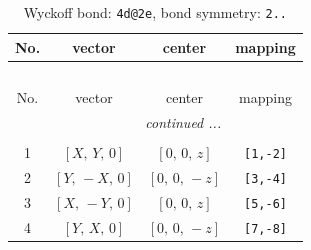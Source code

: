 \documentclass[fleqn,8pt]{jsarticle}
\begin{document}
\renewcommand{\arraystretch}{1.2}
\begin{longtable}{cccc}
\caption{Wyckoff bond: {\tt 4d@2e}, bond symmetry: {\tt 2..}}
 \\
 \hline \hline
No. & vector & center & mapping \\ \hline \endfirsthead

\multicolumn{3}{l}{\tablename\ \thetable{}} \\
 \hline \hline
No. & vector & center & mapping \\ \hline \endhead

 \hline \hline
\multicolumn{3}{r}{\footnotesize\it continued ...} \\ \endfoot

 \hline \hline
\multicolumn{3}{r}{} \\ \endlastfoot

1 & $\left[ X,\, Y,\, 0 \right]$ & $\left[ 0,\, 0,\, z \right]$ & {\tt [1,-2]} \\ \hline
2 & $\left[ Y,\, - X,\, 0 \right]$ & $\left[ 0,\, 0,\, - z \right]$ & {\tt [3,-4]} \\ \hline
3 & $\left[ X,\, - Y,\, 0 \right]$ & $\left[ 0,\, 0,\, z \right]$ & {\tt [5,-6]} \\ \hline
4 & $\left[ Y,\, X,\, 0 \right]$ & $\left[ 0,\, 0,\, - z \right]$ & {\tt [7,-8]} \\
\end{longtable}
\renewcommand{\arraystretch}{1.2}
\end{document}
